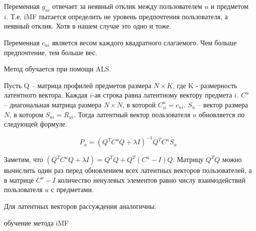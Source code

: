 \documentclass[14pt]{extarticle}
\begin{document}
Переменная $g_{ui}$ отвечает за неявный отклик между пользователем $u$ и предметом $i$. Т.е. iMF пытается определить не уровень предпочтения пользователя, а неявный отклик. Хотя в нашем случае это одно и тоже. 

Переменная $c_{ui}$ является весом каждого квадратного слагаемого. Чем больше предпочтение, тем больше вес. 

Метод обучается при помощи ALS\cite{matrixfactorization}. 

Пусть Q -- матрица профилей предметов размера $N \times K$, где K - размерность латентного вектора. Каждая $i$-ая  строка равна латентному вектору предмета $i$.  $C^u$ -- диагональная матрица размера $N \times N$, в которой $C_{ii}^u = c_{ui}$. $S_u$ -- вектор размера $N$, в котором $S_{ui} = R_{ui}$. Тогда латентный вектор пользователя $u$ обновляется по следующей формуле.

\begin{equation*}
	P_u = (Q^TC^uQ + \lambda I) ^ {-1}Q^TC^uS_u
\end{equation*} 

Заметим, что $(Q^TC^uQ + \lambda I) = Q^TQ + Q^T(C^u - I)Q $. Матрицу $Q^TQ$ можно вычислить один раз перед обновлением всех латентных векторов пользователей, а в матрице $C^u - I$ количество ненулевых элементов равно числу взаимодействий пользователя $u$ с предметами.

Для латентных векторов рассуждения аналогичны.

\begin{algorithm}[h]
\caption{обучение метода iMF}
\begin{algorithmic}[1]
\Repeat {} 
	\EndFor
	\EndFor
{}

\end{algorithmic}
\label{alg:climf}
\end{algorithm}


%
\end{document}
